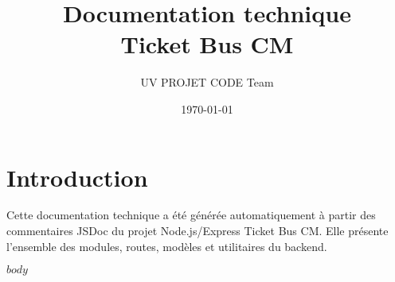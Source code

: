 \documentclass[11pt,a4paper]{report}
\title{\Huge Documentation technique\\[0.5em]\LARGE Ticket Bus CM}
\author{UV PROJET CODE Team}
\date{\today}
\begin{document}
\maketitle
\tableofcontents
\chapter*{Introduction}
Cette documentation technique a été générée automatiquement à partir des commentaires JSDoc du projet Node.js/Express Ticket Bus CM. Elle présente l'ensemble des modules, routes, modèles et utilitaires du backend.

$body$
\end{document}
